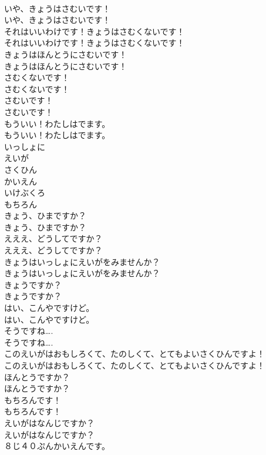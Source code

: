\documentclass[8pt]{extreport}
\begin{document}
\begin{CJK}{UTF8}{min}
\\	いや、きょうはさむいです！	
\\	いや、きょうはさむいです！ 
\\	それはいいわけです！きょうはさむくないです！	
\\	それはいいわけです！きょうはさむくないです！ 
\\	きょうはほんとうにさむいです！	
\\	きょうはほんとうにさむいです！ 
\\	さむくないです！	
\\	さむくないです！ 
\\	さむいです！	
\\	さむいです！ 
\\	もういい！わたしはでます。	
\\	もういい！わたしはでます。 
\\	いっしょに
\\	えいが
\\	さくひん
\\	かいえん
\\	いけぶくろ
\\	もちろん
\\	きょう、ひまですか？	
\\	きょう、ひまですか？ 
\\	えええ、どうしてですか？	
\\	えええ、どうしてですか？ 
\\	きょうはいっしょにえいがをみませんか？	
\\	きょうはいっしょにえいがをみませんか？ 
\\	きょうですか？	
\\	きょうですか？ 
\\	はい、こんやですけど。	
\\	はい、こんやですけど。 
\\	そうですね….	
\\	そうですね…. 
\\	このえいがはおもしろくて、たのしくて、とてもよいさくひんですよ！	
\\	このえいがはおもしろくて、たのしくて、とてもよいさくひんですよ！ 
\\	ほんとうですか？	
\\	ほんとうですか？ 
\\	もちろんです！	
\\	もちろんです！ 
\\	えいがはなんじですか？	
\\	えいがはなんじですか？ 
\\	８じ４０ぷんかいえんです。	

\end{CJK}
\end{document}

